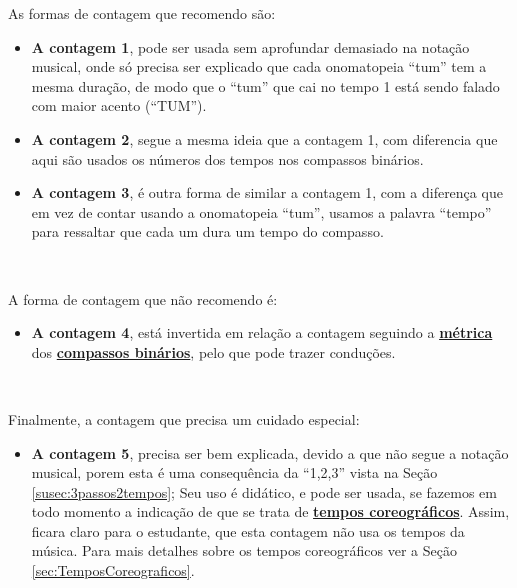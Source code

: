 As formas de contagem que recomendo são:
\begin{itemize}
\item \textbf{A contagem 1},
 pode ser usada sem aprofundar demasiado 
na notação musical, onde só precisa ser explicado que cada onomatopeia ``tum'' tem a mesma duração, 
de modo que  o ``tum'' que cai no tempo 1 está sendo falado com maior acento (``TUM'').
\item \textbf{A contagem 2}, segue a mesma ideia que a contagem 1, 
com diferencia que aqui são usados os números dos tempos nos compassos binários.
\item \textbf{A contagem 3}, 
é outra forma de similar a contagem 1, 
com a diferença que em vez de contar usando a onomatopeia ``tum'',
usamos a palavra ``tempo'' para ressaltar que cada um dura um tempo do compasso. 
\end{itemize}~

A forma de contagem que não recomendo é:
\begin{itemize}
\item \textbf{A contagem 4},
está invertida em relação a contagem seguindo a 
\hyperref[def:Metrica]{\textbf{métrica}} dos \hyperref[subsec:compassobinario]{\textbf{compassos binários}},
pelo que pode trazer conduções.
\end{itemize}~

Finalmente, a contagem que precisa um cuidado especial:
\begin{itemize}
\item \textbf{A contagem 5},
precisa ser bem explicada, 
devido a que não segue a notação musical, 
porem esta é uma consequência da ``1,2,3'' vista na Seção \ref{susec:3passos2tempos}; 
Seu uso é didático, e pode ser usada, se fazemos em todo momento a indicação de 
que se trata de \hyperref[sec:TemposCoreograficos]{\textbf{tempos coreográficos}}.
Assim, ficara claro para o estudante, que esta contagem não usa os tempos da música.
Para mais detalhes sobre os tempos coreográficos ver a Seção \ref{sec:TemposCoreograficos}.
\end{itemize}




